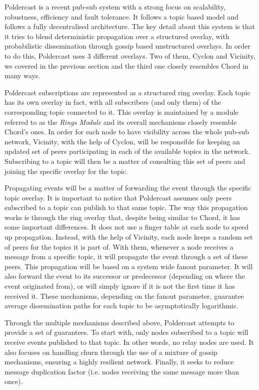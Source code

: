 Poldercast \cite{Setty2012} is a recent pub-sub system with
a strong focus on scalability, robustness, efficiency and fault
tolerance. It follows a topic based model and follows a fully
decentralised architecture. The key detail about this system is that it
tries to blend deterministic propagation over a structured overlay, with
probabilistic dissemination through gossip based unstructured overlays.
In order to do this, Poldercast uses 3 different overlays. Two of them,
Cyclon and Vicinity, we covered in the previous section and the third
one closely resembles Chord in many ways.

Poldercast subscriptions are represented as a structured ring overlay.
Each topic has its own overlay in fact, with all subscribers (and only
them) of the corresponding topic connected to it. This overlay is
maintained by a module referred to as the \emph{Rings Module} and its
overall mechanisms closely resemble Chord's ones. In order for each node
to have visibility across the whole pub-sub network, Vicinity, with the
help of Cyclon, will be responsible for keeping an updated set of peers
participating in each of the available topics in the network.
Subscribing to a topic will then be a matter of consulting this set of
peers and joining the specific overlay for the topic.

Propagating events will be a matter of forwarding the event through the
specific topic overlay. It is important to notice that Poldercast
assumes only peers subscribed to a topic can publish to that same topic.
The way this propagation works is through the ring overlay that, despite
being similar to Chord, it has some important differences. It does not
use a finger table at each node to speed up propagation. Instead, with
the help of Vicinity, each node keeps a random set of peers for the
topics it is part of. With them, whenever a node receives a message from
a specific topic, it will propagate the event through a set of these
peers. This propagation will be based on a system wide fanout parameter.
It will also forward the event to its successor or predecessor
(depending on where the event originated from), or will simply ignore if it
is not the first time it has received it. These mechanisms, depending on
the fanout parameter, guarantee average dissemination paths for each
topic to be asymptotically logarithmic.

Through the multiple mechanisms described above, Poldercast attempts to
provide a set of guarantees. To start with, only nodes subscribed to a
topic will receive events published to that topic. In other words, no
relay nodes are used. It also focuses on handling churn through the use
of a mixture of gossip mechanisms, ensuring a highly resilient network.
Finally, it seeks to reduce message duplication factor (i.e. nodes receiving
the same message more than once).


